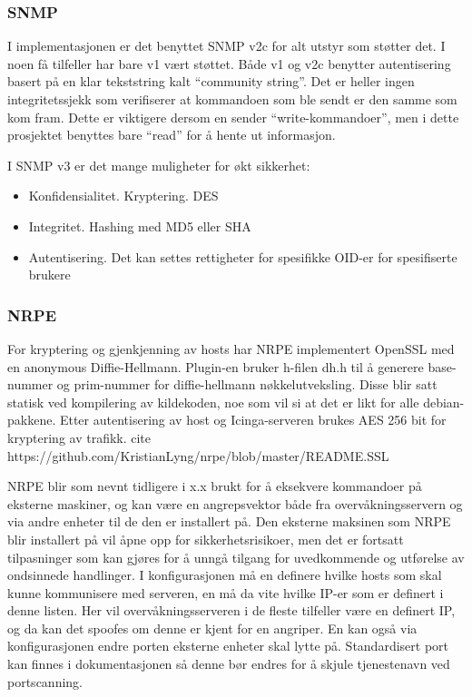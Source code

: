 \subsubsection{SNMP}
I implementasjonen er det benyttet SNMP v2c for alt utstyr som støtter det. I noen få tilfeller har bare v1 vært støttet. Både v1 og v2c benytter autentisering basert på en klar tekststring kalt “community string”. Det er heller ingen integritetssjekk som verifiserer at kommandoen som ble sendt er den samme som kom fram. Dette er viktigere dersom en sender “write-kommandoer”, men i dette prosjektet benyttes bare “read” for å hente ut informasjon.

I SNMP v3 er det mange muligheter for økt sikkerhet:
\begin{itemize}
	\item Konfidensialitet. Kryptering. DES
	\item Integritet. Hashing med MD5 eller SHA
	\item Autentisering. Det kan settes rettigheter for spesifikke OID-er for spesifiserte brukere
\end{itemize}

\subsubsection{NRPE}
For kryptering og gjenkjenning av hosts har NRPE implementert OpenSSL med en anonymous Diffie-Hellmann. Plugin-en bruker h-filen dh.h til å generere base-nummer og prim-nummer for diffie-hellmann nøkkelutveksling. Disse blir satt statisk ved kompilering av kildekoden, noe som vil si at det er likt for alle debian-pakkene. Etter autentisering av host og Icinga-serveren brukes AES 256 bit for kryptering av trafikk. cite https://github.com/KristianLyng/nrpe/blob/master/README.SSL

NRPE blir som nevnt tidligere i x.x brukt for å eksekvere kommandoer på eksterne maskiner, og kan være en angrepsvektor både fra overvåkningsservern og via andre enheter til de den er installert på. Den eksterne maksinen som NRPE blir installert på vil åpne opp for sikkerhetsrisikoer, men det er fortsatt tilpasninger som kan gjøres for å unngå tilgang for uvedkommende og utførelse av ondsinnede handlinger. I konfigurasjonen må en definere hvilke hosts som skal kunne kommunisere med serveren, en må da vite hvilke IP-er som er definert i denne listen. Her vil overvåkningsserveren  i de fleste tilfeller være en definert IP, og da kan det spoofes om denne er kjent for en angriper. En kan også via konfigurasjonen endre porten eksterne enheter skal lytte på. Standardisert port kan finnes i dokumentasjonen så denne bør endres for å skjule tjenestenavn ved portscanning.

